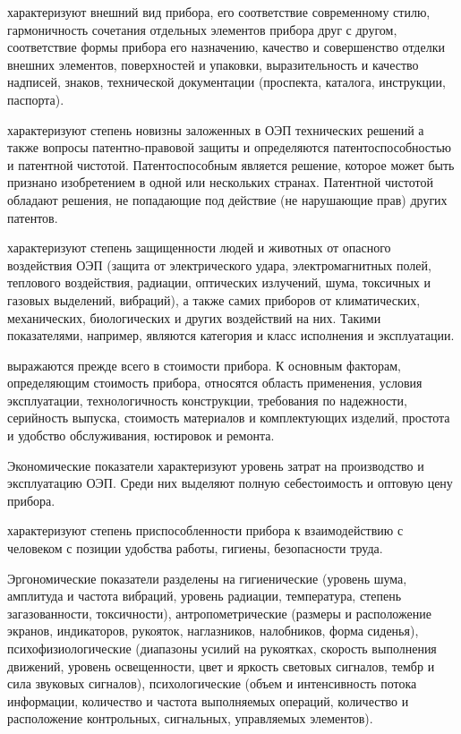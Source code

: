\documentclass{tufte-book}
\begin{document}
 характеризуют внешний вид прибора, его соответствие современному стилю, гармоничность сочетания отдельных элементов прибора друг с другом, соответствие формы прибора его назначению, качество и совершенство отделки внешних элементов, поверхностей и упаковки, выразительность и качество надписей, знаков, технической документации (проспекта, каталога, инструкции, паспорта).

 характеризуют степень новизны заложенных в ОЭП технических решений а также вопросы патентно-правовой  защиты и определяются патентоспособностью и патентной чистотой. Патентоспособным является решение, которое может быть признано изобретением в одной или нескольких странах. Патентной чистотой обладают решения, не попадающие под действие (не нарушающие прав) других патентов.

 характеризуют степень защищенности людей и животных от опасного воздействия ОЭП (защита от электрического удара, электромагнитных полей, теплового воздействия, радиации, оптических излучений, шума, токсичных и газовых выделений, вибраций), а также самих приборов от климатических, механических, биологических и других воздействий на них. Такими показателями, например, являются категория и класс исполнения и эксплуатации.

 выражаются прежде всего в стоимости прибора. К основным факторам, определяющим стоимость прибора, относятся область применения, условия эксплуатации, технологичность конструкции, требования по надежности, серийность выпуска, стоимость материалов и комплектующих изделий, простота и удобство обслуживания, юстировок и ремонта. 

Экономические показатели характеризуют уровень затрат на производство и эксплуатацию ОЭП. Среди них выделяют полную себестоимость и оптовую цену прибора. 

 характеризуют степень приспособленности прибора к взаимодействию с человеком с позиции удобства работы, гигиены, безопасности труда. 

Эргономические показатели разделены на гигиенические (уровень шума, амплитуда и частота вибраций, уровень радиации, температура, степень загазованности, токсичности), антропометрические (размеры и расположение экранов, индикаторов, рукояток, наглазников, налобников, форма сиденья), психофизиологические (диапазоны усилий на рукоятках, скорость выполнения движений, уровень освещенности, цвет и яркость световых сигналов, тембр и сила звуковых сигналов), психологические (объем и интенсивность потока информации, количество и частота выполняемых операций, количество и расположение контрольных, сигнальных, управляемых элементов).
\end{document}

